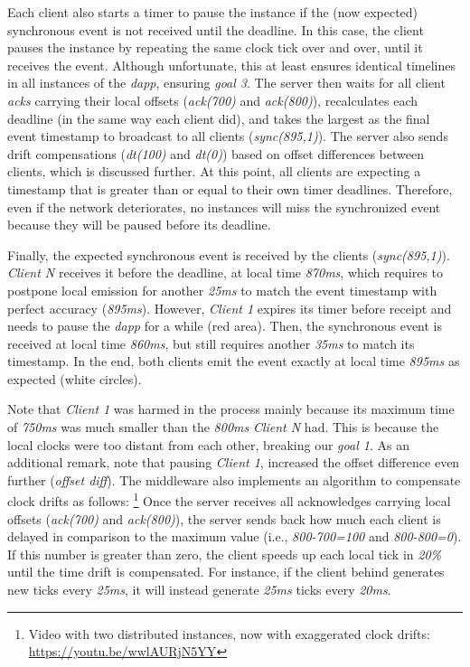 \documentclass[sigplan,screen]{acmart}
\newcommand{\dapp}{\emph{dapp}\xspace}
\begin{document}
Each client also starts a timer to pause the instance if the (now expected)
synchronous event is not received until the deadline.
In this case, the client pauses the instance by repeating the same clock tick
over and over, until it receives the event.
Although unfortunate, this at least ensures identical timelines in all
instances of the \dapp, ensuring \emph{goal 3}.
%
The server then waits for all client \emph{acks} carrying their local offsets
(\emph{ack(700)} and \emph{ack(800)}), recalculates each deadline (in the same
way each client did), and takes the largest as the final event timestamp to
broadcast to all clients (\emph{sync(895,1)}).
The server also sends drift compensations (\emph{dt(100)} and \emph{dt(0)})
based on offset differences between clients, which is discussed further.
At this point, all clients are expecting a timestamp that is greater than or
equal to their own timer deadlines.
Therefore, even if the network deteriorates, no instances will miss the
synchronized event because they will be paused before its deadline.

Finally, the expected synchronous event is received by the clients
(\emph{sync(895,1)}).
\emph{Client N} receives it before the deadline, at local time \emph{870ms},
which requires to postpone local emission for another \emph{25ms} to match the
event timestamp with perfect accuracy (\emph{895ms}).
However, \emph{Client 1} expires its timer before receipt and needs to pause
the \dapp for a while (red area).
Then, the synchronous event is received at local time \emph{860ms}, but still
requires another \emph{35ms} to match its timestamp.
In the end, both clients emit the event exactly at local time \emph{895ms} as
expected (white circles).

Note that \emph{Client 1} was harmed in the process mainly because its maximum
time of \emph{750ms} was much smaller than the \emph{800ms} \emph{Client N}
had.
This is because the local clocks were too distant from each other, breaking our
\emph{goal 1}.
As an additional remark, note that pausing \emph{Client 1}, increased the
offset difference even further (\emph{offset diff}).
%
The middleware also implements an algorithm to compensate clock drifts as
follows:%
\footnote {
    Video with two distributed instances, now with exaggerated clock drifts:
    \url{https://youtu.be/wwlAURjN5YY}
}
Once the server receives all acknowledges carrying local offsets
(\emph{ack(700)} and \emph{ack(800)}), the server sends back how much each
client is delayed in comparison to the maximum value (i.e., \emph{800-700=100}
and \emph{800-800=0}).
If this number is greater than zero, the client speeds up each local tick in
\emph{20\%} until the time drift is compensated.
For instance, if the client behind generates new ticks every \emph{25ms}, it
will instead generate \emph{25ms} ticks every \emph{20ms}.
\end{document}
